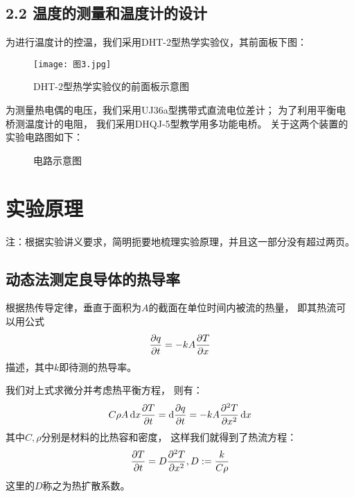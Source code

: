 \documentclass[11pt]{article}
\begin{document}
\subsection*{2.2 温度的测量和温度计的设计}

为进行温度计的控温，我们采用DHT-2型热学实验仪，其前面板下图：
\begin{figure}[H]
    \centering
    \texttt{[image: 图3.jpg]}
    \caption{DHT-2型热学实验仪的前面板示意图}
\end{figure}

为测量热电偶的电压，我们采用UJ36a型携带式直流电位差计；
为了利用平衡电桥测温度计的电阻，
我们采用DHQJ-5型教学用多功能电桥。
关于这两个装置的实验电路图如下：
\begin{figure}[H]
    \centering
    \caption{电路示意图}
\end{figure}






\section{实验原理}
\begin{kaishu}
    注：根据实验讲义要求，简明扼要地梳理实验原理，并且这一部分没有超过两页。
\end{kaishu}

\subsection{动态法测定良导体的热导率}

根据热传导定律，垂直于面积为$A$的截面在单位时间内被流的热量，
即其热流可以用公式
\begin{displaymath}
    \frac{\partial q}{\partial {t}} = -kA \frac{\partial T}{\partial {x}}
\end{displaymath}
描述，其中$k$即待测的热导率。

我们对上式求微分并考虑热平衡方程，
则有：
\begin{displaymath}
    C\rho A\mathop{}\!\mathrm{d}{x}\frac{\partial T}{\partial {t}} = \mathop{}\!\mathrm{d} \frac{\partial q}{\partial {t}} = -kA \frac{\partial^{2} T}{\partial {x^{2}}}\mathop{}\!\mathrm{d} x
\end{displaymath}
其中$C,\rho$分别是材料的比热容和密度，
这样我们就得到了热流方程：
\begin{displaymath}
    \frac{\partial T}{\partial {t}} = D\frac{\partial^{2} T}{\partial {x^{2}}},D:=\frac{k}{C\rho}
\end{displaymath}
这里的$D$称之为热扩散系数。
\end{document}
